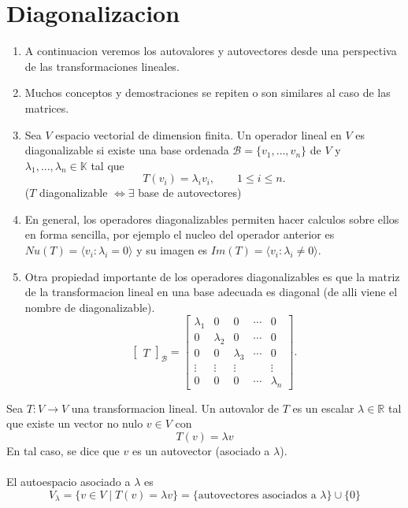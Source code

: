 \documentclass{article}
\theoremstyle{definition}
\theoremstyle{definition}
\theoremstyle{remark}
\begin{document}
\section{Diagonalizacion} 
\begin{enumerate}[label=$\circ$]
  \item A continuacion veremos los autovalores y autovectores desde una perspectiva de las transformaciones lineales.
  \item Muchos conceptos y demostraciones se repiten o son similares al caso de las matrices. 
  \item Sea $V$ espacio vectorial de dimension finita. Un operador lineal en $V$ es diagonalizable si existe una base ordenada $\mathcal{B}=\{v_1, \dots ,v_n\}$ de $V$ y $\lambda_1, \dots ,\lambda_n \in \mathbb{K}$ tal que \[
T(v_i)=  \lambda_i v_i , \quad \quad 1 \leq i \leq n.
    \]
    ($T$ diagonalizable $\Leftrightarrow \exists$ base de autovectores)
  \item En general, los operadores diagonalizables permiten hacer calculos sobre ellos en forma sencilla, por ejemplo el nucleo del operador anterior es $Nu(T)=\langle v_i : \lambda_i = 0 \rangle $ y su imagen es $Im(T)=\langle v_i : \lambda_i \neq 0 \rangle $. 
  \item Otra propiedad importante de los operadores diagonalizables es que la matriz de la transformacion lineal en una base adecuada es diagonal (de alli viene el nombre de diagonalizable). 
    \[
      \begin{bmatrix}T\end{bmatrix}_{\mathcal{B}}=\begin{bmatrix} \lambda_1 & 0 & 0 & \cdots & 0 \\ 0 & \lambda_2 & 0 & \cdots & 0 \\ 0 & 0 & \lambda_3 & \cdots & 0 \\ \vdots & \vdots & \vdots && \vdots \\ 0 & 0 & 0 & \cdots & \lambda_n \end{bmatrix}.
    \]
\end{enumerate}
\begin{defi}
  Sea $T : V \to V$ una transformacion lineal. Un autovalor de $T$ es un escalar $\lambda \in \mathbb{R}$ tal que existe un vector no nulo $v \in V$ con \[
T(v)=\lambda v
  \]
  En tal caso, se dice que $v$ es un autovector (asociado a $\lambda$). \\\\ El autoespacio asociado a $\lambda$ es \[
    V_\lambda = \{v \in V \;|\; T (v) = \lambda v\} = \{ \text{autovectores asociados a }\lambda \} \cup \{0\}
  \]
\end{defi}\pagebreak
\end{document}
